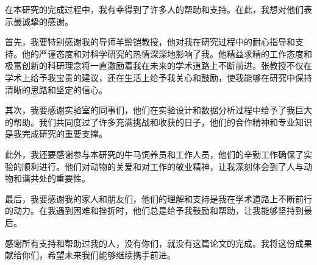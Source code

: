 在本研究的完成过程中，我有幸得到了许多人的帮助和支持。在此，我想对他们表示最诚挚的感谢。

首先，我要特别感谢我的导师羊鬃铠教授，他对我在研究过程中的耐心指导和支持。他的严谨态度和对科学研究的热情深深地影响了我。他精益求精的工作态度和极富创新的科研理念将一直激励着我在未来的学术道路上不断前进。张教授不仅在学术上给予我宝贵的建议，还在生活上给予我关心和鼓励，使我能够在研究中保持清晰的思路和坚定的信心。

其次，我要感谢实验室的同事们，他们在实验设计和数据分析过程中给予了我巨大的帮助。我们共同度过了许多充满挑战和收获的日子，他们的合作精神和专业知识是我完成研究的重要支撑。

此外，我还要感谢参与本研究的牛马饲养员和工作人员，他们的辛勤工作确保了实验的顺利进行。他们对动物的关爱和对工作的敬业精神，让我深刻体会到了人与动物和谐共处的重要性。

最后，我要感谢我的家人和朋友们，他们的理解和支持是我在学术道路上不断前行的动力。在我遇到困难和挫折时，他们总是给予我鼓励和帮助，让我能够坚持到最后。

感谢所有支持和帮助过我的人，没有你们，就没有这篇论文的完成。我将这份成果献给你们，希望未来我们能够继续携手前进。